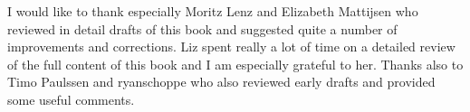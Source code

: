 I would like to thank especially Moritz Lenz and Elizabeth 
Mattijsen who reviewed in detail drafts of this book 
and suggested quite a number of improvements and corrections. 
Liz spent really a lot of time on a detailed 
review of the full content of this book and I am especially 
grateful to her. Thanks also to Timo Paulssen and 
ryanschoppe who also reviewed early drafts and provided some  
useful comments.


\clearemptydoublepage

\begin{latexonly}

\tableofcontents

\clearemptydoublepage

\end{latexonly}

